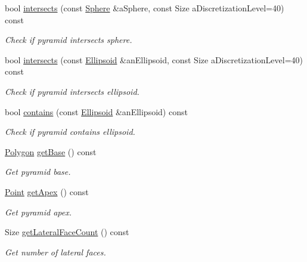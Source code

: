 \begin{DoxyCompactItemize}
bool \hyperlink{classlibrary_1_1math_1_1geom_1_1d3_1_1objects_1_1_pyramid_a704dca8e456461a59fe606bd5df06d20}{intersects} (const \hyperlink{classlibrary_1_1math_1_1geom_1_1d3_1_1objects_1_1_sphere}{Sphere} \&a\+Sphere, const Size a\+Discretization\+Level=40) const
\begin{DoxyCompactList}\small\item\em Check if pyramid intersects sphere. \end{DoxyCompactList}\item 
bool \hyperlink{classlibrary_1_1math_1_1geom_1_1d3_1_1objects_1_1_pyramid_a7a79fd414bea507272e6c88ed66eeba8}{intersects} (const \hyperlink{classlibrary_1_1math_1_1geom_1_1d3_1_1objects_1_1_ellipsoid}{Ellipsoid} \&an\+Ellipsoid, const Size a\+Discretization\+Level=40) const
\begin{DoxyCompactList}\small\item\em Check if pyramid intersects ellipsoid. \end{DoxyCompactList}\item 
bool \hyperlink{classlibrary_1_1math_1_1geom_1_1d3_1_1objects_1_1_pyramid_a32e8fd53701cd4d2c0c6b377ca7902c9}{contains} (const \hyperlink{classlibrary_1_1math_1_1geom_1_1d3_1_1objects_1_1_ellipsoid}{Ellipsoid} \&an\+Ellipsoid) const
\begin{DoxyCompactList}\small\item\em Check if pyramid contains ellipsoid. \end{DoxyCompactList}\item 
\hyperlink{classlibrary_1_1math_1_1geom_1_1d3_1_1objects_1_1_polygon}{Polygon} \hyperlink{classlibrary_1_1math_1_1geom_1_1d3_1_1objects_1_1_pyramid_a247e3c188d7919b2043e59d46b67c2ef}{get\+Base} () const
\begin{DoxyCompactList}\small\item\em Get pyramid base. \end{DoxyCompactList}\item 
\hyperlink{classlibrary_1_1math_1_1geom_1_1d3_1_1objects_1_1_point}{Point} \hyperlink{classlibrary_1_1math_1_1geom_1_1d3_1_1objects_1_1_pyramid_af24d52592c3154d633f694411d11396c}{get\+Apex} () const
\begin{DoxyCompactList}\small\item\em Get pyramid apex. \end{DoxyCompactList}\item 
Size \hyperlink{classlibrary_1_1math_1_1geom_1_1d3_1_1objects_1_1_pyramid_ac208d0799c3180c01db9d5d988d73118}{get\+Lateral\+Face\+Count} () const
\begin{DoxyCompactList}\small\item\em Get number of lateral faces. \end{DoxyCompactList}\item 

\end{DoxyCompactItemize}
